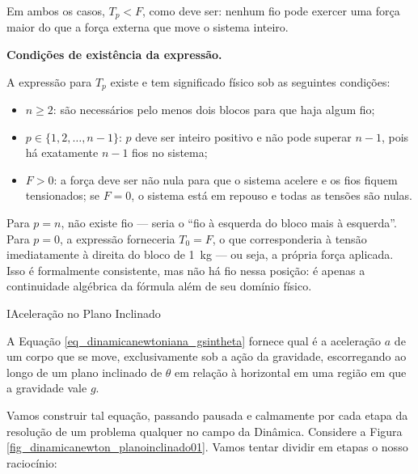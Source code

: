 \begin{exemplo}
Em ambos os casos, $T_p < F$, como deve ser: nenhum fio pode exercer
uma força maior do que a força externa que move o sistema inteiro.

\medskip
\noindent\textbf{Condições de existência da expressão.}

A expressão para $T_p$ existe e tem significado físico sob as seguintes
condições:

\begin{itemize}
  \item $n \geq 2$: são necessários pelo menos dois blocos para que
  haja algum fio;
  \item $p \in \{1, 2, \ldots, n-1\}$: $p$ deve ser inteiro positivo
  e não pode superar $n-1$, pois há exatamente $n-1$ fios no sistema;
  \item $F > 0$: a força deve ser não nula para que o sistema acelere e
  os fios fiquem tensionados; se $F = 0$, o sistema está em repouso e todas
  as tensões são nulas.
\end{itemize}

\noindent Para $p = n$, não existe fio --- seria o ``fio à esquerda do
bloco mais à esquerda''. Para $p = 0$, a expressão forneceria $T_0 =
F$, o que corresponderia à tensão imediatamente à direita do bloco de
\SI{1}{kg} --- ou seja, a própria força aplicada. Isso é formalmente
consistente, mas não há fio nessa posição: é apenas a continuidade
algébrica da fórmula além de seu domínio físico.



\end{exemplo}






\begin{secnivel}{I}{Aceleração no Plano Inclinado}
  

\end{secnivel}






A Equação \eqref{eq_dinamicanewtoniana_gsintheta} fornece qual é a aceleração $a$ de um corpo que se move, exclusivamente sob a ação da gravidade, escorregando ao longo de um plano inclinado de $\theta$ em relação à horizontal em uma região em que a gravidade vale $g.$ 

Vamos construir tal equação, passando pausada e calmamente por cada etapa da resolução de um problema qualquer no campo da Dinâmica. Considere a Figura \ref{fig_dinamicanewton_planoinclinado01}. Vamos tentar dividir em etapas o nosso raciocínio:

